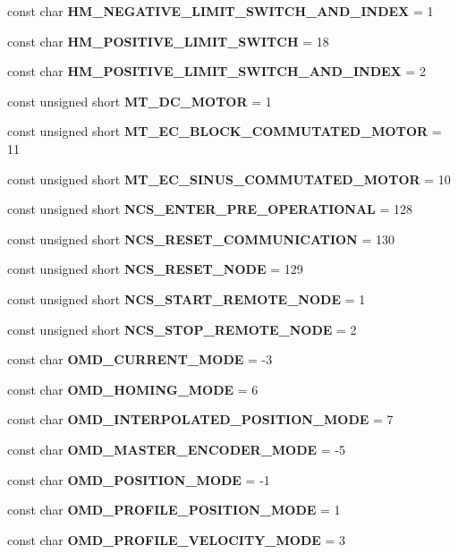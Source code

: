 \begin{DoxyCompactItemize}
const char {\bf \-H\-M\-\_\-\-N\-E\-G\-A\-T\-I\-V\-E\-\_\-\-L\-I\-M\-I\-T\-\_\-\-S\-W\-I\-T\-C\-H\-\_\-\-A\-N\-D\-\_\-\-I\-N\-D\-E\-X} = 1
\item 
const char {\bf \-H\-M\-\_\-\-P\-O\-S\-I\-T\-I\-V\-E\-\_\-\-L\-I\-M\-I\-T\-\_\-\-S\-W\-I\-T\-C\-H} = 18
\item 
const char {\bf \-H\-M\-\_\-\-P\-O\-S\-I\-T\-I\-V\-E\-\_\-\-L\-I\-M\-I\-T\-\_\-\-S\-W\-I\-T\-C\-H\-\_\-\-A\-N\-D\-\_\-\-I\-N\-D\-E\-X} = 2
\item 
const unsigned short {\bf \-M\-T\-\_\-\-D\-C\-\_\-\-M\-O\-T\-O\-R} = 1
\item 
const unsigned short {\bf \-M\-T\-\_\-\-E\-C\-\_\-\-B\-L\-O\-C\-K\-\_\-\-C\-O\-M\-M\-U\-T\-A\-T\-E\-D\-\_\-\-M\-O\-T\-O\-R} = 11
\item 
const unsigned short {\bf \-M\-T\-\_\-\-E\-C\-\_\-\-S\-I\-N\-U\-S\-\_\-\-C\-O\-M\-M\-U\-T\-A\-T\-E\-D\-\_\-\-M\-O\-T\-O\-R} = 10
\item 
const unsigned short {\bf \-N\-C\-S\-\_\-\-E\-N\-T\-E\-R\-\_\-\-P\-R\-E\-\_\-\-O\-P\-E\-R\-A\-T\-I\-O\-N\-A\-L} = 128
\item 
const unsigned short {\bf \-N\-C\-S\-\_\-\-R\-E\-S\-E\-T\-\_\-\-C\-O\-M\-M\-U\-N\-I\-C\-A\-T\-I\-O\-N} = 130
\item 
const unsigned short {\bf \-N\-C\-S\-\_\-\-R\-E\-S\-E\-T\-\_\-\-N\-O\-D\-E} = 129
\item 
const unsigned short {\bf \-N\-C\-S\-\_\-\-S\-T\-A\-R\-T\-\_\-\-R\-E\-M\-O\-T\-E\-\_\-\-N\-O\-D\-E} = 1
\item 
const unsigned short {\bf \-N\-C\-S\-\_\-\-S\-T\-O\-P\-\_\-\-R\-E\-M\-O\-T\-E\-\_\-\-N\-O\-D\-E} = 2
\item 
const char {\bf \-O\-M\-D\-\_\-\-C\-U\-R\-R\-E\-N\-T\-\_\-\-M\-O\-D\-E} = -\/3
\item 
const char {\bf \-O\-M\-D\-\_\-\-H\-O\-M\-I\-N\-G\-\_\-\-M\-O\-D\-E} = 6
\item 
const char {\bf \-O\-M\-D\-\_\-\-I\-N\-T\-E\-R\-P\-O\-L\-A\-T\-E\-D\-\_\-\-P\-O\-S\-I\-T\-I\-O\-N\-\_\-\-M\-O\-D\-E} = 7
\item 
const char {\bf \-O\-M\-D\-\_\-\-M\-A\-S\-T\-E\-R\-\_\-\-E\-N\-C\-O\-D\-E\-R\-\_\-\-M\-O\-D\-E} = -\/5
\item 
const char {\bf \-O\-M\-D\-\_\-\-P\-O\-S\-I\-T\-I\-O\-N\-\_\-\-M\-O\-D\-E} = -\/1
\item 
const char {\bf \-O\-M\-D\-\_\-\-P\-R\-O\-F\-I\-L\-E\-\_\-\-P\-O\-S\-I\-T\-I\-O\-N\-\_\-\-M\-O\-D\-E} = 1
\item 
const char {\bf \-O\-M\-D\-\_\-\-P\-R\-O\-F\-I\-L\-E\-\_\-\-V\-E\-L\-O\-C\-I\-T\-Y\-\_\-\-M\-O\-D\-E} = 3

\end{DoxyCompactItemize}
